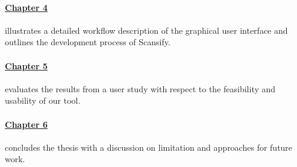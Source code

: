 \paragraph*{\hyperref[sec:implementation]{Chapter 4}} illustrates a detailed workflow description of the graphical user interface and outlines the development process of Scansify.
\paragraph*{\hyperref[sec:results]{Chapter 5}} evaluates the results from a user study with respect to the feasibility and usability of our tool.
\paragraph*{\hyperref[sec:discussion]{Chapter 6}} concludes the thesis with a discussion on limitation and approaches for future work.

\newpage
\thispagestyle{empty}